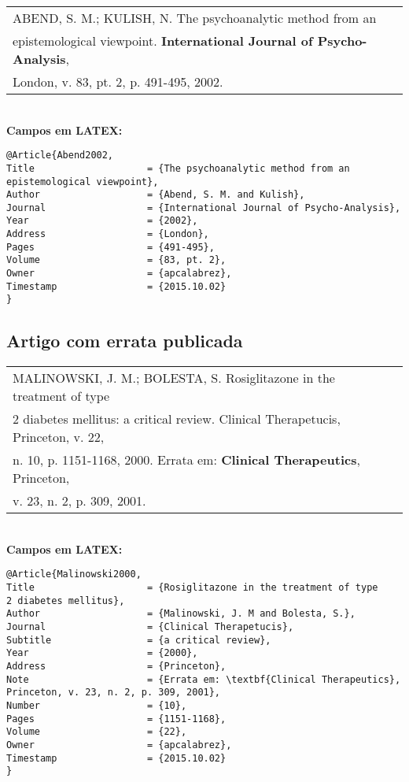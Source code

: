 \begin{tabular}{|l|c|} \hline
ABEND, S. M.; KULISH, N. The psychoanalytic method from an\\
epistemological viewpoint. \textbf{International Journal of Psycho-Analysis}, \\London, v. 83, pt. 2, p. 491-495, 2002. \\\hline
\end{tabular} \\

\textbf{Campos em LATEX:} 

\begin{verbatim}
@Article{Abend2002,
Title                    = {The psychoanalytic method from an 
epistemological viewpoint},
Author                   = {Abend, S. M. and Kulish},
Journal                  = {International Journal of Psycho-Analysis},
Year                     = {2002},
Address                  = {London},
Pages                    = {491-495},
Volume                   = {83, pt. 2},
Owner                    = {apcalabrez},
Timestamp                = {2015.10.02}
}
\end{verbatim}
\subsection{Artigo com errata publicada}

\begin{tabular}{|l|c|} \hline
MALINOWSKI, J. M.; BOLESTA, S. Rosiglitazone in the treatment of
type \\2 diabetes mellitus: a critical review. Clinical Therapetucis,
Princeton, v. 22, \\n. 10, p. 1151-1168, 2000. Errata em: \textbf{Clinical
Therapeutics}, Princeton, \\v. 23, n. 2, p. 309, 2001.
	\\\hline
\end{tabular} \\

\textbf{Campos em LATEX:} 

\begin{verbatim}
@Article{Malinowski2000,
Title                    = {Rosiglitazone in the treatment of type 
2 diabetes mellitus},
Author                   = {Malinowski, J. M and Bolesta, S.},
Journal                  = {Clinical Therapetucis},
Subtitle                 = {a critical review},
Year                     = {2000},
Address                  = {Princeton},
Note                     = {Errata em: \textbf{Clinical Therapeutics}, 
Princeton, v. 23, n. 2, p. 309, 2001},
Number                   = {10},
Pages                    = {1151-1168},
Volume                   = {22},
Owner                    = {apcalabrez},
Timestamp                = {2015.10.02}
}
\end{verbatim}
